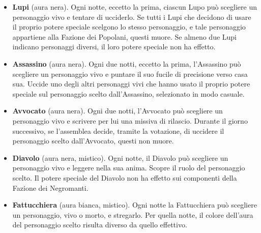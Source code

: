 \documentclass[a4paper,10pt]{article}
\begin{document}
\begin{itemize}
	
	\item {\bf Lupi} (aura nera). Ogni notte, eccetto la prima, ciascun Lupo può scegliere un personaggio vivo e tentare di ucciderlo. Se tutti i Lupi che decidono di usare il proprio potere speciale scelgono lo stesso personaggio, e tale personaggio appartiene alla Fazione dei Popolani, questi muore. Se almeno due Lupi indicano personaggi diversi, il loro potere speciale non ha effetto.
 
 
	\item {\bf Assassino} (aura nera). Ogni due notti, eccetto la prima, l'Assassino può scegliere un personaggio vivo e puntare il suo fucile di precisione verso casa sua. Uccide uno degli altri personaggi vivi che hanno usato il proprio potere speciale sul personaggio scelto dall'Assassino, selezionato in modo casuale.
 

	\item {\bf Avvocato} (aura nera). Ogni due notti, l'Avvocato può scegliere un personaggio vivo e scrivere per lui una missiva di rilascio. Durante il giorno successivo, se l'assemblea decide, tramite la votazione, di uccidere il personaggio scelto dall'Avvocato, questi non muore.
 

	\item {\bf Diavolo} (aura nera, mistico). Ogni notte, il Diavolo può scegliere un personaggio vivo e leggere nella sua anima. Scopre il ruolo del personaggio scelto. Il potere speciale del Diavolo non ha effetto sui componenti della Fazione dei Negromanti.
 
 
	\item {\bf Fattucchiera} (aura bianca, mistico). Ogni notte la Fattucchiera può scegliere un personaggio, vivo o morto, e stregarlo. Per quella notte, il colore dell'aura del personaggio scelto risulta diverso da quello effettivo.
 


\end{itemize}
\end{document}
